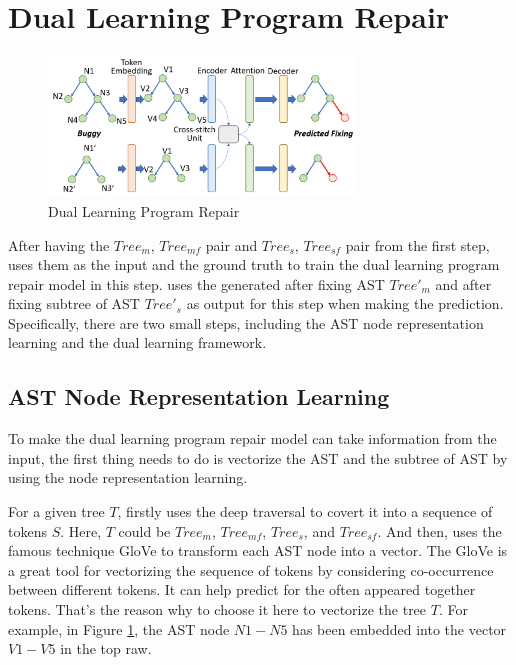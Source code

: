 \section{Dual Learning Program Repair}

\begin{figure}[t]
	\centering
	\includegraphics[width=3.2in]{graphs/program_repair.png}
	\caption{Dual Learning Program Repair}
	\label{program-repair}
\end{figure}

After having the $Tree_m$, $Tree_{mf}$ pair and $Tree_s$, $Tree_{sf}$ pair from the first step, \tool uses them as the input and the ground truth to train the dual learning program repair model in this step. \tool uses the generated after fixing AST $Tree'_m$ and after fixing subtree of AST $Tree'_s$ as output for this step when making the prediction. Specifically, there are two small steps, including the AST node representation learning and the dual learning framework.


\subsection{AST Node Representation Learning}

To make the dual learning program repair model can take information from the input, the first thing \tool needs to do is vectorize the AST and the subtree of AST by using the node representation learning. 

For a given tree $T$, \tool firstly uses the deep traversal to covert it into a sequence of tokens $S$. Here, $T$ could be $Tree_m$, $Tree_{mf}$, $Tree_s$, and $Tree_{sf}$. And then, \tool uses the famous technique GloVe \cite{pennington2014glove} to transform each AST node into a vector. The GloVe is a great tool for vectorizing the sequence of tokens by considering co-occurrence between different tokens. It can help predict for the often appeared together tokens. That's the reason why to choose it here to vectorize the tree $T$. For example, in Figure \ref{program-repair}, the AST node $N1-N5$ has been embedded into the vector $V1-V5$ in the top raw.

